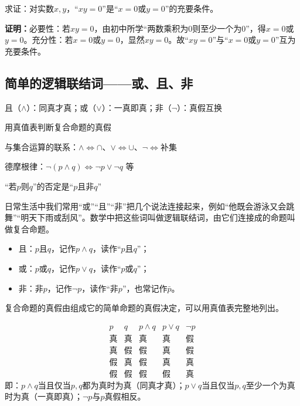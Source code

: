 \begin{exercise}
求证：对实数$x,y$，“$xy=0$”是“$x=0$或$y=0$”的充要条件。
\end{exercise}
\textbf{证明：}必要性：若$xy=0$，由初中所学“两数乘积为$0$则至少一个为$0$”，得$x=0$或$y=0$。充分性：若$x=0$或$y=0$，显然$xy=0$。故“$xy=0$”与“$x=0$或$y=0$”互为充要条件。

\clearpage
\subsection{简单的逻辑联结词——或、且、非}
\begin{know}
    \item 且（$\land$）：同真才真；或（$\lor$）：一真即真；非（$\neg$）：真假互换
    \item 用真值表判断复合命题的真假
    \item 与集合运算的联系：$\land\iff\cap$、$\lor\iff\cup$、$\neg\iff$补集
    \item 德摩根律：$\neg(p\land q)\iff\neg p\lor\neg q$ 等
    \item “若$p$则$q$”的否定是“$p$且非$q$”
\end{know}

日常生活中我们常用“或”“且”“非”把几个说法连接起来，例如“他既会游泳又会跳舞”“明天下雨或刮风”。数学中把这些词叫做逻辑联结词，由它们连接成的命题叫做复合命题。

\begin{definition}[逻辑联结词]
\begin{itemize}
    \item 且：$p$且$q$，记作$p\land q$，读作“$p$且$q$”；
    \item 或：$p$或$q$，记作$p\lor q$，读作“$p$或$q$”；
    \item 非：非$p$，记作$\neg p$，读作“非$p$”，也常记作$\bar{p}$。
\end{itemize}
\end{definition}

复合命题的真假由组成它的简单命题的真假决定，可以用真值表完整地列出。

\begin{definition}[且、或、非的真值表]
\[
\begin{array}{c|c||c|c||c}
p & q & p\land q & p\lor q & \neg p\\\hline
\text{真} & \text{真} & \text{真} & \text{真} & \text{假}\\
\text{真} & \text{假} & \text{假} & \text{真} & \text{假}\\
\text{假} & \text{真} & \text{假} & \text{真} & \text{真}\\
\text{假} & \text{假} & \text{假} & \text{假} & \text{真}
\end{array}
\]
即：$p\land q$当且仅当$p,q$都为真时为真（同真才真）；$p\lor q$当且仅当$p,q$至少一个为真时为真（一真即真）；$\neg p$与$p$真假相反。
\end{definition}

